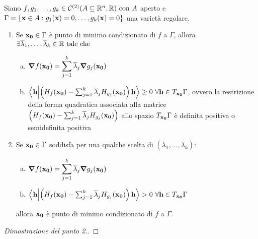 \begin{theorem}
    Siano $f,g_1,\dots,g_k \in \mathcal{C}^{(2)}(A\subseteq\mathbb{R}^n, \mathbb{R}) \text{ con } A$ aperto e $\Gamma = \{ \vb{x} \in A: g_1 (\vb{x})=0, \dots, g_k(\vb{x})=0 \}$ una varietà regolare.
    \begin{enumerate}
        \item Se $\vb{x_0} \in \Gamma$ è punto di minimo condizionato di $f$ a $\Gamma$, allora $\exists \overline{\lambda}_1,\dots,\overline{\lambda}_k \in \mathbb{R} \text{ tale che }$
        \begin{enumerate}[a.]
            \item $\grad f(\vb{x_0})=\displaystyle \sum_{j=1}^k \overline{\lambda}_j \grad g_j(\vb{x_0})$
            \item $\ip{\vb{h}}{\left( H_f(\vb{x_0})-\sum_{j=1}^k\overline{\lambda}_j H_{g_j}(\vb{x_0}) \right)\vb{h}} \geq 0 \ \forall \vb{h} \in T_{\vb{x_0}}\Gamma$, ovvero la restrizione della forma quadratica associata alla matrice $\left( H_f(\vb{x_0})-\sum_{j=1}^k\overline{\lambda}_j H_{g_j}(\vb{x_0}) \right)$ allo spazio $T_{\vb{x_0}}\Gamma$ è definita positiva o semidefinita positiva 
        \end{enumerate}
        \item Se $\vb{x_0} \in \Gamma$ soddisfa per una qualche scelta di $(\overline{\lambda}_1,\dots,\overline{\lambda}_k)$:
        \begin{enumerate}[a.]
            \item $\grad f(\vb{x_0})=\displaystyle\sum_{j=1}^k\overline{\lambda}_j \grad g_j (\vb{x_0})$
            \item $\ip{\vb{h}}{\left( H_f(\vb{x_0})-\sum_{j=1}^k\overline{\lambda}_j H_{g_j}(\vb{x_0}) \right)\vb{h}} > 0 \ \forall \vb{h} \in T_{\vb{x_0}}\Gamma$
        \end{enumerate}
        allora $\vb{x_0}$ è punto di minimo condizionato di $f$ a $\Gamma$.
    \end{enumerate}
\end{theorem}

\begin{proof}
    [Dimostrazione del punto 2.] %
\end{proof}